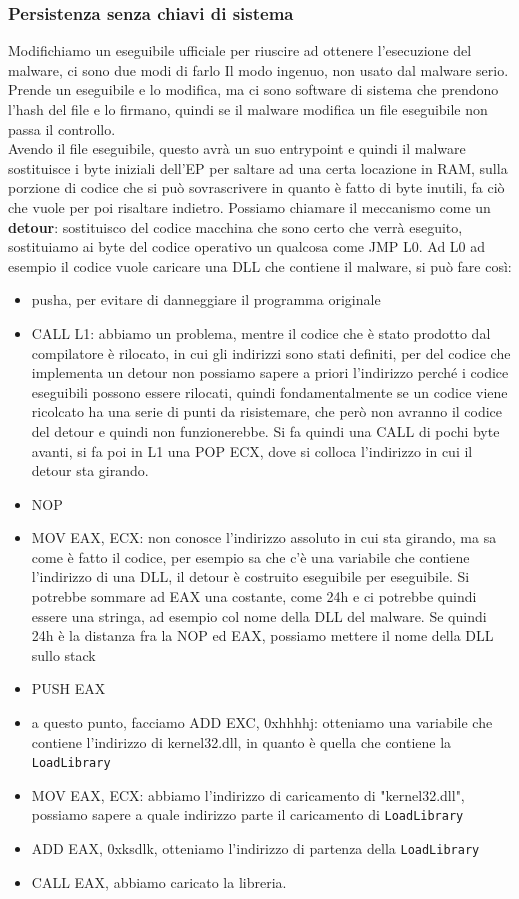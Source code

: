 \documentclass[12pt, oneside]{extbook}
\begin{document}
\subsubsection{Persistenza senza chiavi di sistema}
Modifichiamo un eseguibile ufficiale per riuscire ad ottenere l'esecuzione del malware, ci sono due modi di farlo
Il modo ingenuo, non usato dal malware serio. Prende un eseguibile e lo modifica, ma ci sono software di sistema che prendono l'hash del file e  lo firmano, quindi se il malware modifica un file eseguibile non passa il controllo.\\Avendo il file eseguibile, questo avrà un suo entrypoint e quindi il malware sostituisce i byte iniziali dell'EP per saltare ad una certa locazione in RAM, sulla porzione di codice che si può sovrascrivere in quanto è fatto di byte inutili, fa ciò che vuole per poi risaltare indietro. Possiamo chiamare il meccanismo come un \textbf{detour}: sostituisco del codice macchina che sono certo che verrà eseguito, sostituiamo ai byte del codice operativo un qualcosa come JMP L0. Ad L0 ad esempio il codice vuole caricare una DLL che contiene il malware, si può fare così:
	\begin{itemize}
		\item pusha, per evitare di danneggiare il programma originale
		\item CALL L1: abbiamo un problema, mentre il codice che è stato prodotto dal compilatore è rilocato, in cui gli indirizzi sono stati definiti, per del codice che implementa un detour non possiamo sapere a priori l'indirizzo perché i codice eseguibili possono essere rilocati, quindi fondamentalmente se un codice viene ricolcato ha una serie di punti da risistemare, che però non avranno il codice del detour e quindi non funzionerebbe. Si fa quindi una CALL di pochi byte avanti, si fa poi in L1 una POP ECX, dove si colloca l'indirizzo in cui il detour sta girando.
		\item NOP
		\item MOV EAX, ECX: non conosce l'indirizzo assoluto in cui sta girando, ma sa come è fatto il codice, per esempio sa che c'è una variabile che contiene l'indirizzo di una DLL, il detour è costruito eseguibile per eseguibile. Si potrebbe sommare ad EAX una costante, come 24h e ci potrebbe quindi essere una stringa, ad esempio col nome della DLL del malware. Se quindi 24h è la distanza fra la NOP ed EAX, possiamo mettere il nome della DLL sullo stack
		\item PUSH EAX
		\item a questo punto, facciamo ADD EXC, 0xhhhhj: otteniamo una variabile che contiene l'indirizzo di kernel32.dll, in quanto è quella che contiene la \texttt{LoadLibrary}
		\item MOV EAX, ECX: abbiamo l'indirizzo di caricamento di "kernel32.dll", possiamo sapere a quale indirizzo parte il caricamento di \texttt{LoadLibrary}
		\item ADD EAX, 0xksdlk, otteniamo l'indirizzo di partenza della \texttt{LoadLibrary}
		\item CALL EAX, abbiamo caricato la libreria.
	\end{itemize}
\end{document}
